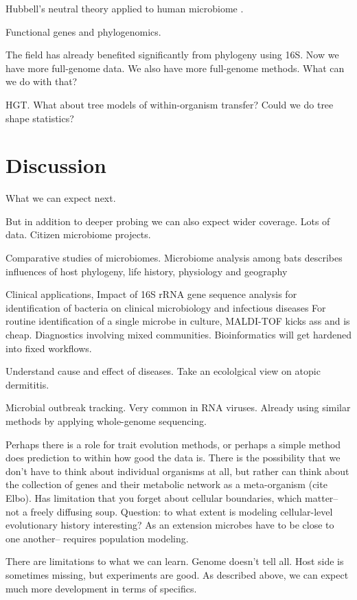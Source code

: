 \documentclass{amsart}
\begin{document}
Hubbell's neutral theory applied to human microbiome \cite{fierer2012animalcules,costello2012application}.

Functional genes and phylogenomics.

The field has already benefited significantly from phylogeny using 16S.
Now we have more full-genome data.
We also have more full-genome methods.
What can we do with that?

HGT.
What about tree models of within-organism transfer?
Could we do tree shape statistics?


\section{Discussion}
What we can expect next.

But in addition to deeper probing we can also expect wider coverage.
Lots of data.
Citizen microbiome projects.

Comparative studies of microbiomes.
\cite{phillips2012microbiome}
Microbiome analysis among bats describes influences of host phylogeny, life history, physiology and geography

Clinical applications,
\cite{clarridge2004}
{{I}mpact of 16{S} r{RNA} gene sequence analysis for identification of bacteria on clinical microbiology and infectious diseases}
For routine identification of a single microbe in culture, MALDI-TOF kicks ass and is cheap.
Diagnostics involving mixed communities.
Bioinformatics will get hardened into fixed workflows.

Understand cause and effect of diseases.
Take an ecololgical view on atopic dermititis.

Microbial outbreak tracking.
Very common in RNA viruses.
Already using similar methods by applying whole-genome sequencing.

Perhaps there is a role for trait evolution methods, or perhaps a simple method does prediction to within how good the data is.
There is the possibility that we don't have to think about individual organisms at all, but rather can think about the collection of genes and their metabolic network as a meta-organism (cite Elbo).
Has limitation that you forget about cellular boundaries, which matter-- not a freely diffusing soup.
Question: to what extent is modeling cellular-level evolutionary history interesting?
As an extension microbes have to be close to one another-- requires population modeling.

There are limitations to what we can learn.
Genome doesn't tell all.
Host side is sometimes missing, but experiments are good.
As described above, we can expect much more development in terms of specifics.
\cite{hooper2012interactions}
\end{document}
